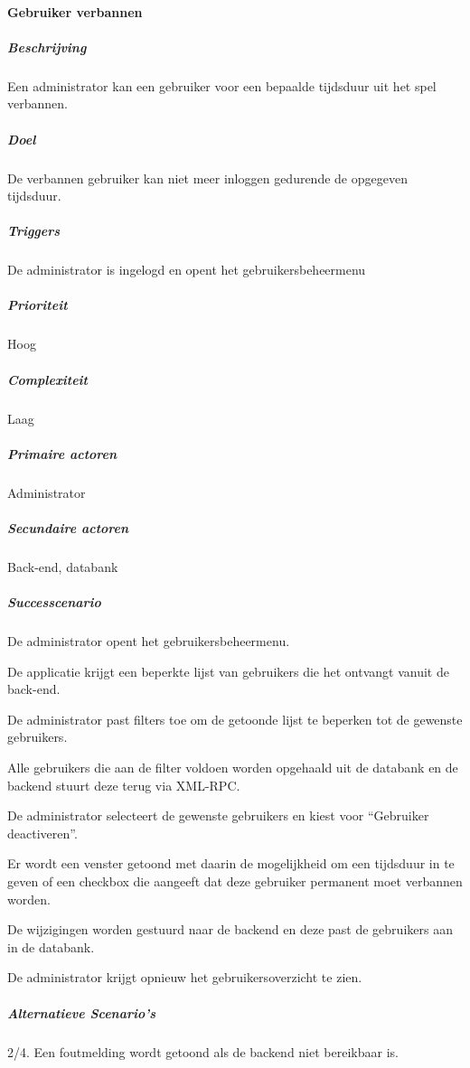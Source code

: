\paragraph{Gebruiker verbannen}
\begin{compact}
\subparagraph{Beschrijving} Een administrator kan een gebruiker voor een bepaalde tijdsduur uit het spel verbannen.
\subparagraph{Doel} De verbannen gebruiker kan niet meer inloggen gedurende de opgegeven tijdsduur.
\subparagraph{Triggers}De administrator is ingelogd en opent het gebruikersbeheermenu
\subparagraph{Prioriteit}Hoog
\subparagraph{Complexiteit}Laag
\subparagraph{Primaire actoren}Administrator
\subparagraph{Secundaire actoren}Back-end, databank
\subparagraph{Successcenario}
\begin{enumerate_compact}
 \item De administrator opent het gebruikersbeheermenu.
 \item De applicatie krijgt een beperkte lijst van gebruikers die het ontvangt vanuit de back-end.
 \item De administrator past filters toe om de getoonde lijst te beperken tot de gewenste gebruikers.
 \item Alle gebruikers die aan de filter voldoen worden opgehaald uit de databank en de backend stuurt deze terug via XML-RPC.
 \item De administrator selecteert de gewenste gebruikers en kiest voor ``Gebruiker deactiveren''.
 \item Er wordt een venster getoond met daarin de mogelijkheid om een tijdsduur in te geven of een checkbox die aangeeft dat deze gebruiker permanent moet verbannen worden.
 \item De wijzigingen worden gestuurd naar de backend en deze past de gebruikers aan in de databank.
 \item De administrator krijgt opnieuw het gebruikersoverzicht te zien.
\end{enumerate_compact}
\subparagraph{Alternatieve Scenario's}
\begin{enumerate_compact}
	\item[2/4.] Een foutmelding wordt getoond als de backend niet bereikbaar is.
\end{enumerate_compact}
\end{compact}


